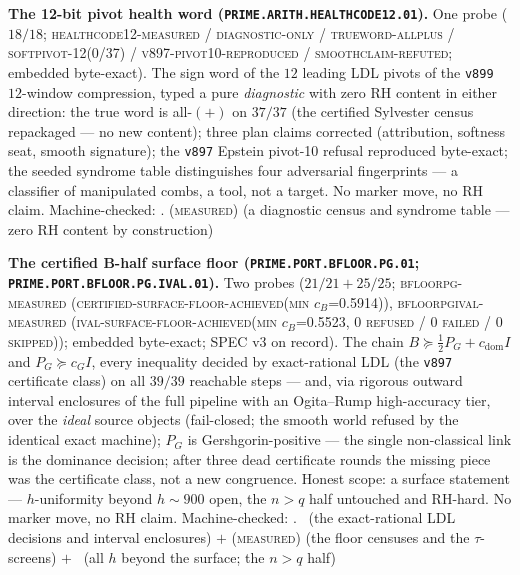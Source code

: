 \par\smallskip\noindent\textbf{The 12-bit pivot health word
(\texttt{PRIME.ARITH.\allowbreak HEALTHCODE12.01}).}
One probe ($18/18$; \textsc{healthcode12-measured /
diagnostic-only / trueword-allplus / softpivot-12(0/37) /
v897-pivot10-reproduced / smoothclaim-refuted}; embedded
byte-exact).  The sign word of the $12$ leading LDL pivots of
the \texttt{v899} $12$-window compression, typed a pure
\emph{diagnostic} with zero RH content in either direction: the
true word is all-$(+)$ on $37/37$ (the certified Sylvester
census repackaged --- no new content); three plan claims
corrected (attribution, softness seat, smooth signature); the
\texttt{v897} Epstein pivot-10 refusal reproduced byte-exact;
the seeded syndrome table distinguishes four adversarial
fingerprints --- a classifier of manipulated combs, a tool, not
a target.  No marker move, no RH claim.
Machine-checked: .
(\textsc{measured}) (a diagnostic census and syndrome table ---
zero RH content by construction)
\par\smallskip


\par\smallskip\noindent\textbf{The certified B-half surface
floor (\texttt{PRIME.PORT.BFLOOR.\allowbreak PG.01};
\texttt{PRIME.PORT.BFLOOR.PG.\allowbreak IVAL.01}).}
Two probes ($21/21 + 25/25$; \textsc{bfloorpg-measured
(certified-surface-floor-achieved(min $c_B$=0.5914))},
\textsc{bfloorpgival-measured
(ival-surface-floor-achieved(min $c_B$=0.5523, 0 refused / 0
failed / 0 skipped))}; embedded byte-exact; SPEC v3 on record).
The chain $B \succeq \tfrac12 P_G + c_{\mathrm{dom}} I$ and
$P_G \succeq c_G I$, every inequality decided by exact-rational
LDL (the \texttt{v897} certificate class) on all $39/39$
reachable steps --- and, via rigorous outward interval
enclosures of the full pipeline with an Ogita--Rump
high-accuracy tier, over the \emph{ideal} source objects
(fail-closed; the smooth world refused by the identical exact
machine); $P_G$ is Gershgorin-positive --- the single
non-classical link is the dominance decision; after three dead
certificate rounds the missing piece was the certificate class,
not a new congruence.  Honest scope: a surface statement ---
$h$-uniformity beyond $h \sim 900$ open, the $n > q$ half
untouched and RH-hard.  No marker move, no RH claim.
Machine-checked: .
\mE\ (the exact-rational LDL decisions and interval enclosures)
$+$ (\textsc{measured}) (the floor censuses and the
$\tau$-screens) $+$ \mO\ (all $h$ beyond the surface; the
$n > q$ half)
\par\smallskip


